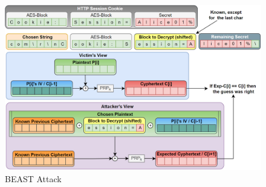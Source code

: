 \begin{figure}[h]
    \centering
    \includegraphics{image/beast.png}
    \caption{BEAST Attack}
    \label{fig:beast}
\end{figure}
